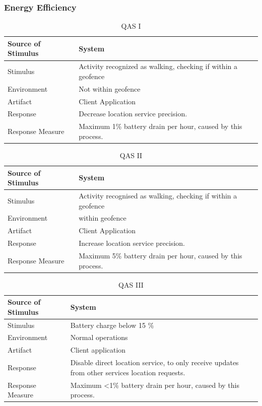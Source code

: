 \subsubsection{Energy Efficiency}
\begin{table}[H]
\centering
\caption{QAS I}
\label{tab:qasI}
\begin{tabularx}{\textwidth}{|l|X|}
\hline
Source of Stimulus & System \\ \hline
Stimulus & Activity recognized as walking, checking if within a geofence \\ \hline
Environment & Not within geofence \\ \hline
Artifact & Client Application \\ \hline
Response & Decrease location service precision. \\ \hline
Response Measure & Maximum 1\% battery drain per hour, caused by this process. \\ \hline
\end{tabularx}
\end{table}

\begin{table}[H]
\centering
\caption{QAS II}
\label{tab:qasII}
\begin{tabularx}{\textwidth}{|l|X|}
\hline
Source of Stimulus & System \\ \hline
Stimulus & Activity recognised as walking, checking if within a geofence \\ \hline
Environment & within geofence \\ \hline
Artifact & Client Application \\ \hline
Response & Increase location service precision. \\ \hline
Response Measure & Maximum 5\% battery drain per hour, caused by this process. \\ \hline
\end{tabularx}
\end{table}

\begin{table}[H]
\centering
\caption{QAS III}
\label{tab:qasIII}
\begin{tabularx}{\textwidth}{|l|X|}
\hline
Source of Stimulus & System \\ \hline
Stimulus & Battery charge below 15 \% \\ \hline
Environment & Normal operations \\ \hline
Artifact & Client application \\ \hline
Response & Disable direct location service, to only receive updates from other services location requests. \\ \hline
Response Measure & Maximum \textless1\% battery drain per hour, caused by this process. \\ \hline
\end{tabularx}
\end{table}

